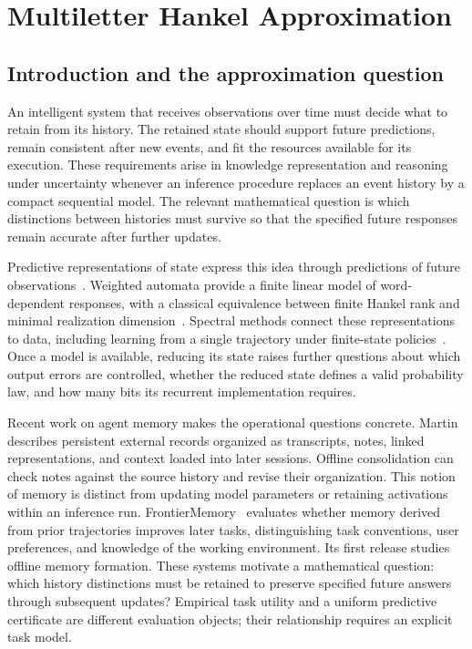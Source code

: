 \chapter{Multiletter Hankel Approximation}\label{sec:hankel}

\section{Introduction and the approximation question}
An intelligent system that receives observations over time must decide
what to retain from its history. The retained state should support future
predictions, remain consistent after new events, and fit the resources
available for its execution. These requirements arise in knowledge
representation and reasoning under uncertainty whenever an inference
procedure replaces an event history by a compact sequential model.
The relevant mathematical question is which distinctions between
histories must survive so that the specified future responses remain
accurate after further updates.

Predictive representations of state express this idea through predictions
of future observations~\citep{littman2001}. Weighted automata provide a
finite linear model of word-dependent responses, with a classical
equivalence between finite Hankel rank and minimal realization
dimension~\citep{carlyle1971,fliess1974}. Spectral methods connect these
representations to data, including learning from a single trajectory
under finite-state policies~\citep{balle2017}. Once a model is available,
reducing its state raises further questions about which output errors are
controlled, whether the reduced state defines a valid probability law,
and how many bits its recurrent implementation requires.

Recent work on agent memory makes the operational questions concrete.
Martin~\citep{martin2026memory} describes persistent external records
organized as transcripts, notes, linked representations, and context
loaded into later sessions. Offline consolidation can check notes against
the source history and revise their organization. This notion of memory
is distinct from updating model parameters or retaining activations
within an inference run. FrontierMemory~\citep{letta2026frontiermemoryv1}
evaluates whether memory derived from prior trajectories improves later
tasks, distinguishing task conventions, user preferences, and knowledge
of the working environment. Its first release studies offline memory
formation. These systems motivate a mathematical question: which
history distinctions must be retained to preserve specified future
answers through subsequent updates? Empirical task utility and a
uniform predictive certificate are different evaluation objects; their
relationship requires an explicit task model.

